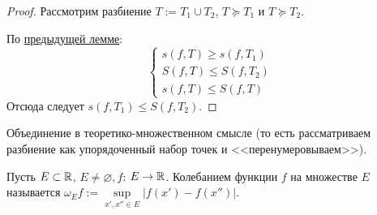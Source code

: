 \begin{proof}
    Рассмотрим разбиение $T := T_1 \cup T_2$, $T \succcurlyeq T_1$ и $T \succcurlyeq T_2$. 
    
    По \hyperlink{lemma12.2}{предыдущей лемме}: 
    $$
    \begin{cases}
        s(f, T) \geq s(f, T_1) \\ 
        S(f, T) \leq S(f, T_2) \\ 
        s(f, T) \leq S(f, T) 
    \end{cases}
    $$
    Отсюда следует $s(f, T_1) \leq S(f, T_2)$.
\end{proof}
\begin{note}
    Объединение в теоретико-множественном смысле (то есть рассматриваем разбиение как упорядоченный набор точек и <<перенумеровываем>>).
\end{note}
\begin{reminder}
    Пусть $E \subset \mathbb{R}$, $E \neq \varnothing, f$: $E \rightarrow \mathbb{R}$. Колебанием функции $f$ на множестве $E$ называется $\omega_{E}f := \sup \limits_{x', x'' \in E} |f(x') - f(x'')|$.
\end{reminder}